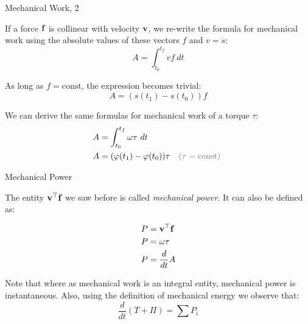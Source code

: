 \documentclass{beamer}
\begin{document}
\begin{frame}{Mechanical Work, 2}
	\begin{flushleft}
		
		If a force $\mathbf{f}$ is collinear with velocity $\mathbf{v}$, we re-write the formula for mechanical work using the absolute values of these vectors $f$ and $v = \dot s$:
		\begin{equation}
			A = \int_{t_0}^{t_f} v f \  dt
		\end{equation}
		
		As long as $f = \text{const}$, the expression becomes trivial:
		\begin{equation}
			A =  (s(t_1) - s(t_0)) f
		\end{equation}
	
		We can derive the same formulas for mechanical work of a torque $\tau$:
		\begin{align}
			A &= \int_{t_0}^{t_f} \omega \tau \  dt
			 \\
			A &= (\varphi(t_1) - \varphi(t_0)) \tau \ \ \ \textcolor{mygrey}{(\tau =  \text{const})} \
		\end{align}
	
	\end{flushleft}
\end{frame}


\begin{frame}{Mechanical Power}
	\begin{flushleft}
		
		The entity $\mathbf{v}^\top \mathbf{f}$ we saw before is called \emph{mechanical power}. It can also be defined as:
		
		\begin{align}
			P &= \mathbf{v}^\top \mathbf{f}
			\\
			P &= \omega \tau
			\\
			P &= \frac{d}{dt} A
		\end{align}
		
		Note that where as mechanical work is an integral entity, mechanical power is instantaneous. Also, using the definition of mechanical energy we observe that:
		\begin{equation}
			\frac{d}{dt} (T + \Pi) = \sum P_i
		\end{equation}	
		
	\end{flushleft}
\end{frame}


\myqrframe
\end{document}
